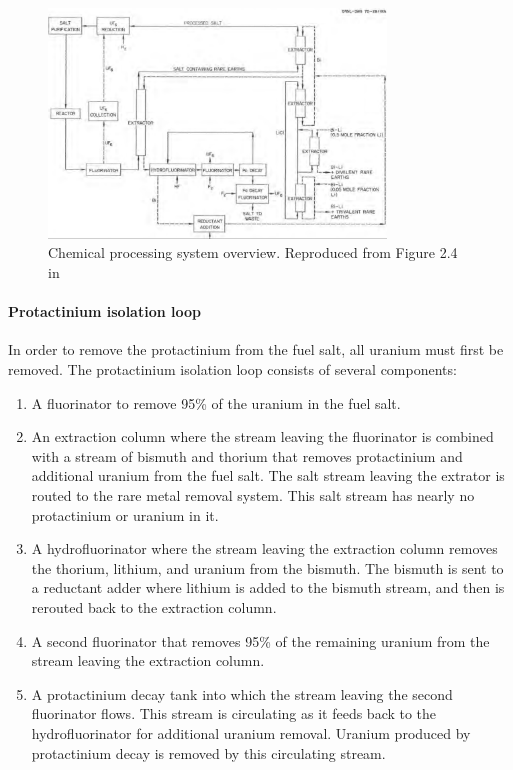 \begin{figure}[htpb]
    \centering
    \includegraphics[width=0.8\textwidth]{figs/ch4/chemical_processing_system.png}
    \caption{Chemical processing system overview. Reproduced from Figure 2.4 in \cite{robertson_conceptual_1971}}
    \label{fig:}
\end{figure}

\paragraph{Protactinium isolation loop}
In order to remove the protactinium from the fuel salt, all uranium must first be removed. The protactinium isolation loop consists of several components: 
\begin{enumerate}
    \item A fluorinator to remove 95\% of the uranium in the fuel salt.
    \item An extraction column where the stream leaving the fluorinator is combined with a stream of bismuth and thorium that removes protactinium and additional uranium from the fuel salt. The salt stream leaving the extrator is routed to the rare metal removal system. This salt stream has nearly no protactinium or uranium in it.
    \item A hydrofluorinator where the stream leaving the extraction column removes the thorium, lithium, and uranium from the bismuth. The bismuth is sent to a reductant adder where lithium is added to the bismuth stream, and then is rerouted back to the extraction column.
    \item A second fluorinator that removes 95\% of the remaining uranium from the stream leaving the extraction column.
    \item A protactinium decay tank into which the stream leaving the second fluorinator flows. This stream is circulating as it feeds back to the hydrofluorinator for additional uranium removal. Uranium produced by protactinium decay is removed by this circulating stream.
\end{enumerate}

